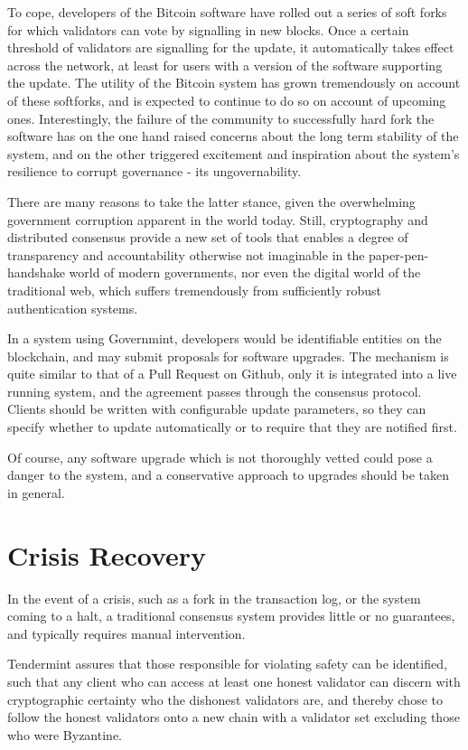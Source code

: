 To cope, developers of the Bitcoin software have rolled out a series of soft forks for which validators can vote by signalling in new blocks. 
Once a certain threshold of validators are signalling for the update,
it automatically takes effect across the network, at least for users with a version of the software supporting the update.
The utility of the Bitcoin system has grown tremendously on account of these softforks, 
and is expected to continue to do so on account of upcoming ones.
Interestingly, the failure of the community to successfully hard fork the software has
on the one hand raised concerns about the long term stability of the system,
and on the other triggered excitement and inspiration about the system's resilience to corrupt governance - its ungovernability.

There are many reasons to take the latter stance, 
given the overwhelming government corruption apparent in the world today.
Still, cryptography and distributed consensus provide a new set of tools that enables a degree
of transparency and accountability otherwise not imaginable in the paper-pen-handshake world of modern governments,
nor even the digital world of the traditional web, which suffers tremendously from sufficiently robust authentication systems.

In a system using Governmint, developers would be identifiable entities on the blockchain,
and may submit proposals for software upgrades. 
The mechanism is quite similar to that of a Pull Request on Github, 
only it is integrated into a live running system,
and the agreement passes through the consensus protocol.
Clients should be written with configurable update parameters, 
so they can specify whether to update automatically or to require that they are notified first.

Of course, any software upgrade which is not thoroughly vetted could pose a danger to the system,
and a conservative approach to upgrades should be taken in general.

\section{Crisis Recovery}

In the event of a crisis, such as a fork in the transaction log,
or the system coming to a halt, 
a traditional consensus system provides little or no guarantees,
and typically requires manual intervention.

Tendermint assures that those responsible for violating safety can be identified,
such that any client who can access at least one honest validator 
can discern with cryptographic certainty who the dishonest validators are,
and thereby chose to follow the honest validators onto a new chain with a validator set excluding those who were Byzantine.

